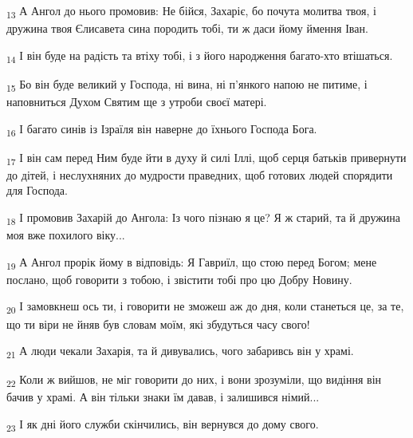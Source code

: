\begin{tcolorbox}
\textsubscript{13} А Ангол до нього промовив: Не бійся, Захаріє, бо почута молитва твоя, і дружина твоя Єлисавета сина породить тобі, ти ж даси йому ймення Іван.
\end{tcolorbox}
\begin{tcolorbox}
\textsubscript{14} І він буде на радість та втіху тобі, і з його народження багато-хто втішаться.
\end{tcolorbox}
\begin{tcolorbox}
\textsubscript{15} Бо він буде великий у Господа, ні вина, ні п'янкого напою не питиме, і наповниться Духом Святим ще з утроби своєї матері.
\end{tcolorbox}
\begin{tcolorbox}
\textsubscript{16} І багато синів із Ізраїля він наверне до їхнього Господа Бога.
\end{tcolorbox}
\begin{tcolorbox}
\textsubscript{17} І він сам перед Ним буде йти в духу й силі Іллі, щоб серця батьків привернути до дітей, і неслухняних до мудрости праведних, щоб готових людей спорядити для Господа.
\end{tcolorbox}
\begin{tcolorbox}
\textsubscript{18} І промовив Захарій до Ангола: Із чого пізнаю я це? Я ж старий, та й дружина моя вже похилого віку...
\end{tcolorbox}
\begin{tcolorbox}
\textsubscript{19} А Ангол прорік йому в відповідь: Я Гавриїл, що стою перед Богом; мене послано, щоб говорити з тобою, і звістити тобі про цю Добру Новину.
\end{tcolorbox}
\begin{tcolorbox}
\textsubscript{20} І замовкнеш ось ти, і говорити не зможеш аж до дня, коли станеться це, за те, що ти віри не йняв був словам моїм, які збудуться часу свого!
\end{tcolorbox}
\begin{tcolorbox}
\textsubscript{21} А люди чекали Захарія, та й дивувались, чого забаривсь він у храмі.
\end{tcolorbox}
\begin{tcolorbox}
\textsubscript{22} Коли ж вийшов, не міг говорити до них, і вони зрозуміли, що видіння він бачив у храмі. А він тільки знаки їм давав, і залишився німий...
\end{tcolorbox}
\begin{tcolorbox}
\textsubscript{23} І як дні його служби скінчились, він вернувся до дому свого.
\end{tcolorbox}
